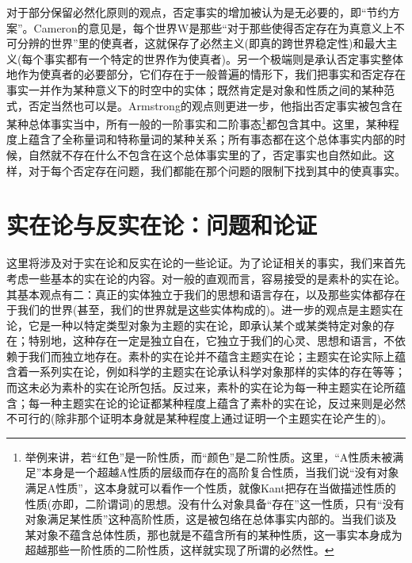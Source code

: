 \documentclass{article}
\begin{document}
对于部分保留必然化原则的观点，否定事实的增加被认为是无必要的，即“节约方案”。Cameron的意见是，每个世界W是那些“对于那些使得否定存在为真意义上不可分辨的世界”里的使真者，这就保存了必然主义(即真的跨世界稳定性)和最大主义(每个事实都有一个特定的世界作为使真者)。另一个极端则是承认否定事实整体地作为使真者的必要部分，它们存在于一般普遍的情形下，我们把事实和否定存在事实一并作为某种意义下的时空中的实体；既然肯定是对象和性质之间的某种范式，否定当然也可以是。Armstrong的观点则更进一步，他指出否定事实被包含在某种总体事实当中，所有一般的一阶事实和二阶事态\footnote{举例来讲，若“红色”是一阶性质，而“颜色”是二阶性质。这里，“A性质未被满足”本身是一个超越A性质的层级而存在的高阶复合性质，当我们说“没有对象满足A性质”，这本身就可以看作一个性质，就像Kant把存在当做描述性质的性质(亦即，二阶谓词)的思想。没有什么对象具备“存在”这一性质，只有“没有对象满足某性质”这种高阶性质，这是被包络在总体事实内部的。当我们谈及某对象不蕴含总体性质，那也就是不蕴含所有的某种性质，这一事实本身成为超越那些一阶性质的二阶性质，这样就实现了所谓的必然性。}都包含其中。这里，某种程度上蕴含了全称量词和特称量词的某种关系；所有事态都在这个总体事实内部的时候，自然就不存在什么不包含在这个总体事实里的了，否定事实也自然如此。这样，对于每个否定存在问题，我们都能在那个问题的限制下找到其中的使真事实。

\section{实在论与反实在论：问题和论证}
这里将涉及对于实在论和反实在论的一些论证。为了论证相关的事实，我们来首先考虑一些基本的实在论的内容。对一般的直观而言，容易接受的是素朴的实在论。其基本观点有二：真正的实体独立于我们的思想和语言存在，以及那些实体都存在于我们的世界(甚至，我们的世界就是这些实体构成的)。进一步的观点是主题实在论，它是一种以特定类型对象为主题的实在论，即承认某个或某类特定对象的存在；特别地，这种存在一定是独立自在，它独立于我们的心灵、思想和语言，不依赖于我们而独立地存在。素朴的实在论并不蕴含主题实在论；主题实在论实际上蕴含着一系列实在论，例如科学的主题实在论承认科学对象那样的实体的存在等等；而这未必为素朴的实在论所包括。反过来，素朴的实在论为每一种主题实在论所蕴含；每一种主题实在论的论证都某种程度上蕴含了素朴的实在论，反过来则是必然不可行的(除非那个证明本身就是某种程度上通过证明一个主题实在论产生的)。
\end{document}
